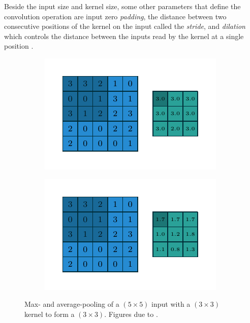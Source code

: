 Beside the input size and kernel size, some other parameters that define the convolution operation are input zero \textit{padding}, the distance between two consecutive positions of the kernel on the input called the \textit{stride}, and \textit{dilation} which controls the distance between the inputs read by the kernel at a single position \cite{Dumoulin2018}.

\begin{figure}[tbp!]
    \begin{subfigure}[b]{0.49\textwidth}
        \centering
        \includegraphics[width=\textwidth]{graphics/neuralnetworks/numerical_max_pooling_00.pdf}
        \caption{}
        \label{fig: Neural networks: numnumerical_max_pooling_00}
    \end{subfigure}
    \hfill
    \begin{subfigure}[b]{0.49\textwidth}
        \centering
        \includegraphics[width=\textwidth]{graphics/neuralnetworks/numerical_average_pooling_00.pdf}
        \caption{}
        \label{fig: Neural networks: numerical_average_pooling_00}
    \end{subfigure}
    \caption{ Max- and  average-pooling of a $(5\times5)$ input with a $(3\times3)$ kernel to form a $(3\times3)$. Figures due to \cite{Dumoulin2018}.}
    \label{fig: Neural networks: numerical_pooling}
\end{figure}
